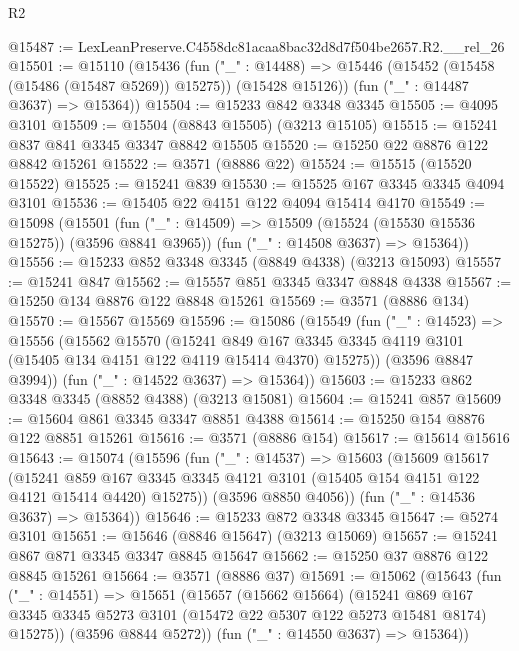 \begin{lexlean}{R2}
\begin{coremodule}
@15487 := LexLeanPreserve.C4558dc81acaa8bac32d8d7f504be2657.R2.__rel_26
@15501 := @15110
    (@15436
      (fun ("_" : @14488) =>
      @15446 (@15452 (@15458 (@15486 (@15487 @5269)) @15275)) (@15428 @15126))
      (fun ("_" : @14487 @3637) => @15364))
@15504 := @15233 @842 @3348 @3345
@15505 := @4095 @3101
@15509 := @15504 (@8843 @15505) (@3213 @15105)
@15515 := @15241 @837 @841 @3345 @3347 @8842 @15505
@15520 := @15250 @22 @8876 @122 @8842 @15261
@15522 := @3571 (@8886 @22)
@15524 := @15515 (@15520 @15522)
@15525 := @15241 @839
@15530 := @15525 @167 @3345 @3345 @4094 @3101
@15536 := @15405 @22 @4151 @122 @4094 @15414 @4170
@15549 := @15098
    (@15501
      (fun ("_" : @14509) => @15509 (@15524 (@15530 @15536 @15275)) (@3596 @8841 @3965))
      (fun ("_" : @14508 @3637) => @15364))
@15556 := @15233 @852 @3348 @3345 (@8849 @4338) (@3213 @15093)
@15557 := @15241 @847
@15562 := @15557 @851 @3345 @3347 @8848 @4338
@15567 := @15250 @134 @8876 @122 @8848 @15261
@15569 := @3571 (@8886 @134)
@15570 := @15567 @15569
@15596 := @15086
    (@15549
      (fun ("_" : @14523) =>
      @15556
        (@15562
          @15570
          (@15241
            @849
            @167
            @3345
            @3345
            @4119
            @3101
            (@15405 @134 @4151 @122 @4119 @15414 @4370)
            @15275))
        (@3596 @8847 @3994))
      (fun ("_" : @14522 @3637) => @15364))
@15603 := @15233 @862 @3348 @3345 (@8852 @4388) (@3213 @15081)
@15604 := @15241 @857
@15609 := @15604 @861 @3345 @3347 @8851 @4388
@15614 := @15250 @154 @8876 @122 @8851 @15261
@15616 := @3571 (@8886 @154)
@15617 := @15614 @15616
@15643 := @15074
    (@15596
      (fun ("_" : @14537) =>
      @15603
        (@15609
          @15617
          (@15241
            @859
            @167
            @3345
            @3345
            @4121
            @3101
            (@15405 @154 @4151 @122 @4121 @15414 @4420)
            @15275))
        (@3596 @8850 @4056))
      (fun ("_" : @14536 @3637) => @15364))
@15646 := @15233 @872 @3348 @3345
@15647 := @5274 @3101
@15651 := @15646 (@8846 @15647) (@3213 @15069)
@15657 := @15241 @867 @871 @3345 @3347 @8845 @15647
@15662 := @15250 @37 @8876 @122 @8845 @15261
@15664 := @3571 (@8886 @37)
@15691 := @15062
    (@15643
      (fun ("_" : @14551) =>
      @15651
        (@15657
          (@15662 @15664)
          (@15241
            @869
            @167
            @3345
            @3345
            @5273
            @3101
            (@15472 @22 @5307 @122 @5273 @15481 @8174)
            @15275))
        (@3596 @8844 @5272))
      (fun ("_" : @14550 @3637) => @15364))

\end{coremodule}
\end{lexlean}
